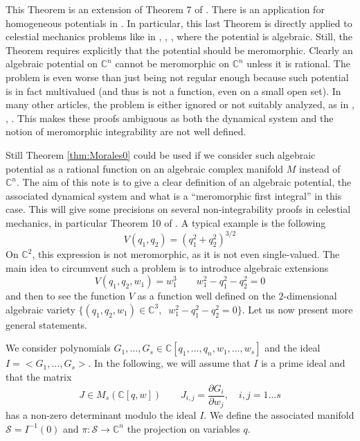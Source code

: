 \documentclass[smallcondensed]{svjour3}
\begin{document}
This Theorem is an extension of Theorem 7 of \cite{5}. There is an application for homogeneous potentials in \cite{22}. In particular, this last Theorem is directly applied to celestial mechanics problems like in \cite{8}, \cite{9}, \cite{37}, \cite{31} where the potential is algebraic. Still, the Theorem requires explicitly that the potential should be meromorphic. Clearly an algebraic potential on $\mathbb{C}^n$ cannot be meromorphic on $\mathbb{C}^n$ unless it is rational. The problem is even worse than just being not regular enough because such potential is in fact multivalued (and thus is not a function, even on a small open set). In many other articles, the problem is either ignored or not suitably analyzed, as in \cite{9}, \cite{32}, \cite{25}. This makes these proofs ambiguous as both the dynamical system and the notion of meromorphic integrability are not well defined.

Still Theorem \ref{thm:Morales0} could be used if we consider such algebraic potential as a rational function on an algebraic complex manifold $M$ instead of $\mathbb{C}^n$. The aim of this note is to give a clear definition of an algebraic potential, the associated dynamical system and what is a ``meromorphic first integral'' in this case. This will give some precisions on several non-integrability proofs in celestial mechanics, in particular Theorem 10 of \cite{45}. A typical example is the following
$$V(q_1,q_2)=( q_1^2+q_2^2)^{3/2}$$
On $\mathbb{C}^2$, this expression is not meromorphic, as it is not even single-valued. The main idea to circumvent such a problem is to introduce algebraic extensions
\begin{equation}\label{example}
V(q_1,q_2,w_1)=w_1^3 \qquad w_1^2-q_1^2-q_2^2=0
\end{equation}
and then to see the function $V$ as a function well defined on the $2$-dimensional algebraic variety $\{(q_1,q_2,w_1)\in\mathbb{C}^3,\;\; w_1^2-q_1^2-q_2^2=0\}$. Let us now present more general statements.

\bigskip

We consider polynomials $G_1,\dots,G_s\in\mathbb{C}[q_1,\dots,q_n,w_1,\dots,w_s]$ and the ideal $I=<\! G_1,\dots,G_s\!>$. In the following, we will assume that $I$ is a prime ideal and that the matrix
$$J\in M_s(\mathbb{C}[q,w]) \qquad J_{i,j}=\frac{\partial G_i}{\partial w_j},\quad i,j=1\dots s$$
has a non-zero determinant modulo the ideal $I$. We define the associated manifold $\mathcal{S}=I^{-1}(0)$ and $\pi:\mathcal{S} \longrightarrow \mathbb{C}^n$ the projection on variables $q$.
\end{document}
